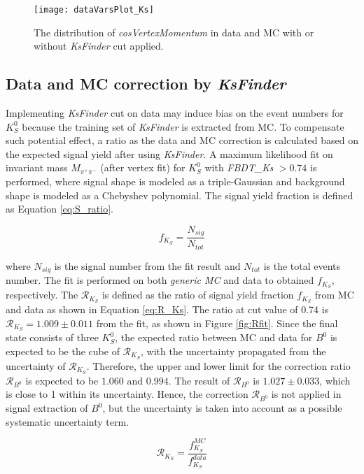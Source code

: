  \begin{figure}[htpb]
	\centering
	\texttt{[image: dataVarsPlot\_Ks]}
	\caption{The distribution of \textit{cosVertexMomentum} in data and MC with or without \textit{KsFinder} cut applied.}
	\label{fig:cosVex_dataMC}
\end{figure}

\subsection{Data and MC correction by \textit{KsFinder}}
Implementing \textit{KsFinder} cut on data may induce bias on the event numbers for $K_S^0$ because the training set of \textit{KsFinder} is extracted from MC. To compensate such potential effect, a ratio as the data and MC correction is calculated based on the expected signal yield after using \textit{KsFinder}. A maximum likelihood fit on invariant mass $M_{\pi^+\pi^-}$ (after vertex fit) for $K_S^0$ with \textit{FBDT\_Ks} $>0.74$ is performed, where signal shape is modeled as a triple-Gaussian and background shape is modeled as a Chebyshev polynomial. The signal yield fraction is defined as Equation \ref{eq:S_ratio}.

\begin{equation}\label{eq:S_ratio}
	f_{K_S} = \frac{N_{sig}}{N_{tot}}
\end{equation}

where $N_{sig}$ is the signal number from the fit result and $N_{tot}$ is the total events number.
The fit is performed on both \textit{generic MC} and data to obtained $f_{K_S} $, respectively.
The $\mathcal{R}_{K_S}$ is defined as the ratio of signal yield fraction  $f_{K_S} $ from MC and data as shown in Equation \ref{eq:R_Ks}. The ratio at cut value of 0.74 is $\mathcal{R}_{K_S} = 1.009\pm 0.011$ from the fit, as shown in Figure \ref{fig:Rfit}. Since the final state consists of three $K_S^0$, the expected ratio between MC and data for $B^0$ is expected to be the cube of $\mathcal{R}_{K_S}$, with the uncertainty propagated from the uncertainty of $\mathcal{R}_{K_S}$.  Therefore, the upper and lower limit for the correction ratio  $\mathcal{R}_{B^0}$ is expected to be $1.060$ and $0.994$. The result of $\mathcal{R}_{B^0}$ is $1.027 \pm 0.033$, which is close to 1 within its uncertainty. Hence, the correction $\mathcal{R}_{B^0}$ is not applied in signal extraction of $B^0$, but the uncertainty is taken into account as a possible systematic uncertainty term. 
 
\begin{equation}\label{eq:R_Ks}
\mathcal{R}_{K_S} = \frac{f_{K_S}^{MC}}{f_{K_S}^{data}}
\end{equation}

